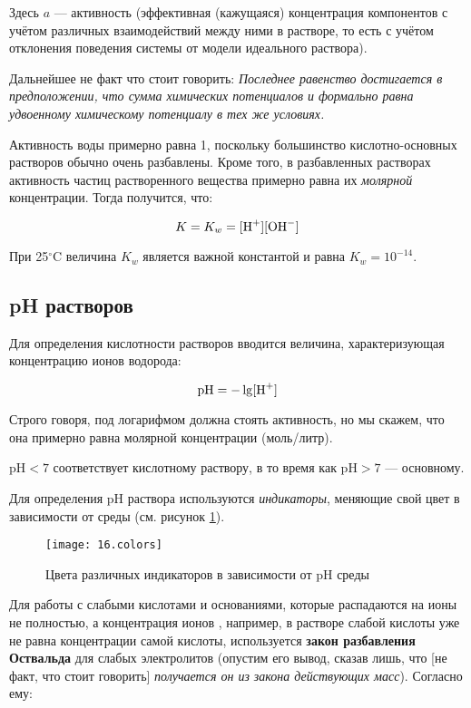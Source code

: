Здесь $a$ --- активность (эффективная (кажущаяся) концентрация компонентов с учётом различных взаимодействий между ними в растворе, то есть с учётом отклонения поведения системы от модели идеального раствора).

Дальнейшее не факт что стоит говорить: \textit{Последнее равенство достигается в предположении, что сумма химических потенциалов  и  формально равна удвоенному химическому потенциалу  в тех же условиях.}

Активность воды примерно равна 1, поскольку большинство кислотно-основных растворов обычно очень разбавлены. Кроме того, в разбавленных растворах активность частиц растворенного вещества примерно равна их \textit{молярной} концентрации. Тогда получится, что:

\begin{equation}
	K = K_w = [\ce{H+}][\ce{OH-}]
	\label{eq:16.water_const}
\end{equation}

При 25$^\circ$C величина $K_w$ является важной константой и равна $K_w = 10^{-14}$.

\subsection{pH растворов}

Для определения кислотности растворов вводится величина, характеризующая концентрацию ионов водорода:

\begin{equation}
	\text{pH} = -\lg [\ce{H+}]
\end{equation}

Строго говоря, под логарифмом должна стоять активность, но мы скажем, что она примерно равна молярной концентрации (моль/литр).

pH$<7$ соответствует кислотному раствору, в то время как pH$>7$ --- основному.

Для определения pH раствора используются \textit{индикаторы}, меняющие свой цвет в зависимости от среды (см. рисунок \ref{fig:16.colors}).

\begin{figure}[H]
	\centering
	\texttt{[image: 16.colors]}
	\caption{Цвета различных индикаторов в зависимости от pH среды}
	\label{fig:16.colors}
\end{figure}

Для работы с слабыми кислотами и основаниями, которые распадаются на ионы не полностью, а концентрация ионов , например, в растворе слабой кислоты уже не равна концентрации самой кислоты, используется \textbf{закон разбавления Оствальда} для слабых электролитов (опустим его вывод, сказав лишь, что [не факт, что стоит говорить] \textit{получается он из закона действующих масс}). Согласно ему:

